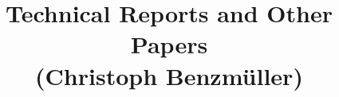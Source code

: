 \documentclass{article}
\begin{document}
\title{Technical Reports and Other Papers \\
 (Christoph Benzm{\"u}ller)}
\maketitle
\nocite{*}

%

\end{document}
